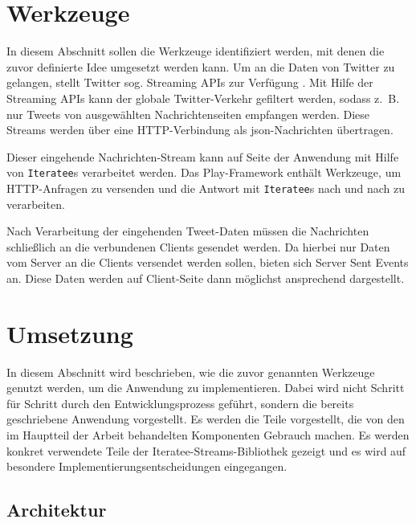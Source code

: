 
\section{Werkzeuge} %
\label{sec:werkzeuge}

In diesem Abschnitt sollen die Werkzeuge identifiziert werden, mit denen die zuvor definierte Idee umgesetzt werden kann.
Um an die Daten von Twitter zu gelangen, stellt Twitter sog. Streaming APIs zur Verfügung \cite[vgl.][]{twitter_streaming_apis}.
Mit Hilfe der Streaming APIs kann der globale Twitter-Verkehr gefiltert werden, sodass z.~B. nur Tweets von ausgewählten Nachrichtenseiten empfangen werden.
Diese Streams werden über eine HTTP-Verbindung als \gls{json}-Nachrichten übertragen.

Dieser eingehende Nachrichten-Stream kann auf Seite der Anwendung mit Hilfe von \lstinline|Iteratee|s verarbeitet werden.
Das Play-Framework enthält Werkzeuge, um HTTP-Anfragen zu versenden und die Antwort mit \lstinline|Iteratee|s nach und nach zu verarbeiten.

Nach Verarbeitung der eingehenden Tweet-Daten müssen die Nachrichten schließlich an die verbundenen Clients gesendet werden.
Da hierbei nur Daten vom Server an die Clients versendet werden sollen, bieten sich Server Sent Events an.
Diese Daten werden auf Client-Seite dann möglichst ansprechend dargestellt.


\section{Umsetzung} %
\label{sec:umsetzung}

In diesem Abschnitt wird beschrieben, wie die zuvor genannten Werkzeuge genutzt werden, um die Anwendung zu implementieren.
Dabei wird nicht Schritt für Schritt durch den Entwicklungsprozess geführt, sondern die bereits geschriebene Anwendung vorgestellt.
Es werden die Teile vorgestellt, die  von den im Hauptteil der Arbeit behandelten Komponenten Gebrauch machen.
Es werden konkret verwendete Teile der Iteratee-Streams-Bibliothek gezeigt und es wird auf besondere Implementierungsentscheidungen eingegangen.

\subsection{Architektur} %
\label{sub:architektur_twitter_news}

